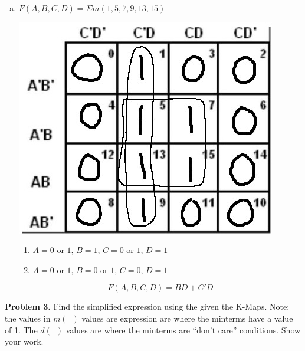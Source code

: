 \documentclass[11pt]{article}
\begin{document}
\begin{enumerate}[a)]
    \item
    $F(A,B,C,D) = \Sigma m(1,5,7,9,13,15)$
    \vspace{-15pt}\begin{center}
        \includegraphics[scale=0.35]{2d.jpg}
    \end{center}
    \vspace{-20pt}\begin{enumerate}[$\bullet$]
        \item $A = 0$ or $1,\, B = 1,\, C = 0$ or $1,\, D = 1$
        \item \vspace{-5pt}$A = 0$ or $1,\, B = 0$ or $1,\, C = 0,\, D = 1$
    \end{enumerate}
    $$F(A,B,C,D) = BD + C'D$$
\end{enumerate}

\pagebreak


\textbf{Problem 3.} Find the simplified expression using the given the K-Maps. Note: the 
values in $m(\,\,\,)$ values are expression are where the minterms have a value of 1.
The $d(\,\,\,)$ values are where the minterms are “don’t care” conditions. 
Show your work.
\end{document}
